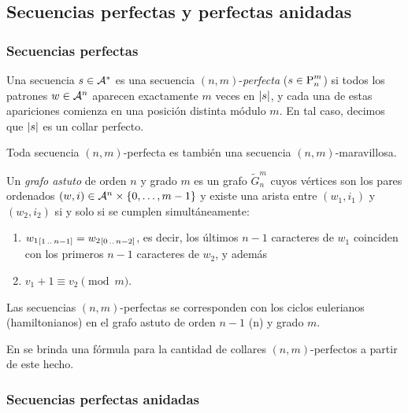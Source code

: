 \subsection{Secuencias perfectas y perfectas anidadas}

\subsubsection{Secuencias perfectas}

\begin{defi}
  Una secuencia $s \in \mathcal{A}^*$ es una secuencia $(n,m)$-\emph{perfecta}
  ($s \in \text{P}_{n}^{m}$) si todos los patrones $w \in \mathcal{A}^n$ aparecen
  exactamente $m$ veces en $\left\vert s\right\vert$, y cada una de estas apariciones comienza
  en una posición distinta módulo $m$. En tal caso, decimos que $\left\vert s\right\vert$
  es un collar perfecto.
\end{defi}

\begin{obs}
  Toda secuencia $(n,m)$-perfecta es también una secuencia $(n,m)$-maravillosa.
\end{obs}

\begin{defi}
  Un \emph{grafo astuto} de orden $n$ y grado $m$ es un grafo $\tilde{G}_n^m$
  cuyos vértices son los pares ordenados $(w, i) \in \mathcal{A}^n \times \lbrace
    0,\dots,m-1 \rbrace$ y existe una arista entre $(w_1, i_1)$ y $(w_2, i_2)$
  si y solo si se cumplen simultáneamente:
  \begin{enumerate}
    \item ${w_1}_{[1\,..\,n-1]} = {w_2}_{[0\,..\,n-2]}$, es decir, los últimos
          $n-1$ caracteres de $w_1$ coinciden con los primeros $n-1$ caracteres
          de $w_2$, y además
    \item $v_1 + 1 \equiv v_2 \pmod{m}$.
  \end{enumerate}
\end{defi}

\begin{obs}
  Las secuencias $(n,m)$-perfectas se corresponden con los ciclos
  eulerianos (hamiltonianos) en el grafo astuto de orden $n-1$ (n) y grado $m$.

  En \cite{ALVAREZ201648} se brinda una fórmula para la cantidad de
  collares $(n,m)$-perfectos a partir de este hecho.
\end{obs}

\subsubsection{Secuencias perfectas anidadas}

